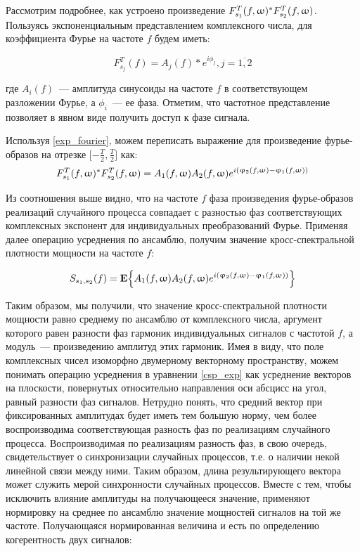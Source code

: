 Рассмотрим подробнее, как устроено произведение
$F_{s_1}^T(f,\upomega)^* F_{s_2}^T(f,\upomega)$.
Пользуясь экспоненциальным представлением комплексного числа, для коэффициента Фурье на частоте $f$
будем иметь:

\begin{equation}
    F_{s_j}^T(f) = A_j(f) * e^{i\phi_j}, j=\overline{1,2}
    \label{exp_fourier}
\end{equation}

где $A_i(f)$~--- амплитуда синусоиды на частоте $f$ в соответствующем разложении Фурье, а
$\phi_i$~--- ее фаза.
Отметим, что частотное представление позволяет в явном виде получить доступ к фазе сигнала.

Используя \ref{exp_fourier}, можем переписать выражение для произведение фурье-образов
на отрезке $\Big[{-\frac{T}{2}}, \frac{T}{2}\Big]$ как:
\begin{equation}
    F_{s_1}^T(f,\upomega)^* F_{s_2}^T(f,\upomega) =
    A_1(f,\upomega)A_2(f,\upomega) e^{i(\upvarphi_2(f,\upomega) - \upvarphi_1(f,\upomega))}
\end{equation}

Из соотношения выше видно, что на частоте $f$ фаза произведения фурье-образов
реализаций случайного процесса совпадает с разностью фаз соответствующих
комплексных экспонент для индивидуальных преобразований Фурье. Применяя далее
операцию усреднения по ансамблю, получим значение кросс-спектральной плотности мощности
на частоте $f$:

\begin{equation}
    S_{s_1, s_2}(f) = \mathbf{E}\Big\{A_1(f,\upomega)A_2(f,\upomega) e^{i(\upvarphi_2(f,\upomega) - \upvarphi_1(f,\upomega))}\Big\}
    \label{csp_exp}
\end{equation}

Таким образом, мы получили, что значение кросс-спектральной плотности мощности равно
среднему по ансамблю от комплексного числа, аргумент которого равен разности фаз
гармоник индивидуальных сигналов с частотой $f$, а  модуль~--- произведению амплитуд этих гармоник.
Имея в виду, что поле комплексных чисел изоморфно двумерному векторному пространству, можем понимать
операцию усреднения в уравнении \ref{csp_exp} как усреднение векторов на плоскости,
повернутых относительно направления оси абсцисс на угол, равный разности фаз сигналов.
Нетрудно понять, что средний вектор при фиксированных амплитудах будет иметь тем большую норму,
чем более воспроизводима соответствующая разность фаз по реализациям случайного процесса.
Воспроизводимая по реализациям разность фаз, в свою очередь, свидетельствует
о синхронизации случайных процессов, т.е. о наличии некой линейной связи между ними.
Таким образом, длина результирующего вектора может служить мерой синхронности случайных процессов.
Вместе с тем, чтобы исключить влияние амплитуды на получающееся значение, применяют нормировку на
среднее по ансамблю значение мощностей сигналов на той же частоте.
Получающаяся нормированная величина и есть по определению когерентность двух сигналов:

